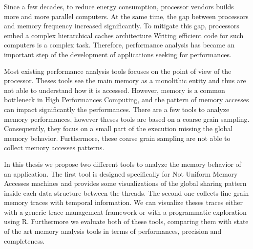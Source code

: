 
Since a few decades, to reduce energy consumption, processor vendors builds more and more parallel computers.
At the same time, the gap between processors and memory frequency increased significantly.
To mitigate this gap, processors embed a complex hierarchical caches architecture
Writing efficient code for such computers is a complex task.
Therefore, performance analysis has became an important step of the development of applications seeking for performances.

Most existing performance analysis tools focuses on the point of view of the processor.
Theses tools see the main memory as a monolithic entity and thus are not able to understand how it is accessed.
However, memory is a common bottleneck in High Performances Computing, and the pattern of memory accesses can impact significantly the performances.
There are a few tools to analyze memory performances, however theses tools are based on a coarse grain sampling.
Consequently, they focus on a small part of the execution missing the global memory behavior.
Furthermore, these coarse grain sampling are not able to collect memory accesses patterns.

In this thesis we propose two different tools to analyze the memory behavior of an application.
The first tool is designed specifically for Not Uniform Memory Accesses machines and provides some visualizations of the global sharing pattern inside each data structure between the threads.
The second one collects fine grain memory traces with temporal information.
We can visualize theses traces either with a generic trace management framework or with a programmatic exploration using R.
Furthermore we evaluate both of these tools, comparing them with state of the art memory analysis tools in terms of performances, precision and completeness.


